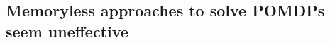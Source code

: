 \subsection{Memoryless approaches to solve POMDPs seem uneffective}

    
    
    



    

    


